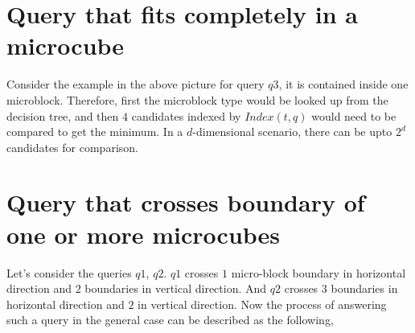 \section{Query that fits completely in a microcube}
Consider the example in the above picture for query $q3$, it is contained inside one microblock. Therefore, first the microblock type would be looked up from the decision tree, and then $4$ candidates indexed by $Index(t,q)$ would need to be compared to get the minimum. In a $d$-dimensional scenario, there can be upto $2^d$ candidates for comparison.
\section{Query that crosses boundary of one or more microcubes}
Let's consider the queries $q1$, $q2$. $q1$ crosses $1$ micro-block boundary in horizontal direction and $2$ boundaries in vertical direction. And $q2$ crosses $3$ boundaries in horizontal direction and $2$ in vertical direction. 
Now the process of answering such a query in the general case can be described as the following,
\compress
